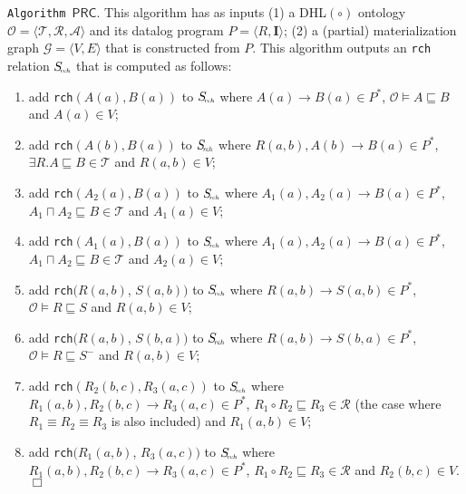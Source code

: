 \noindent\texttt{Algorithm~$\mathsf{PRC}$}. This algorithm has as inputs (1)
a DHL$(\circ)$ ontology $\mathcal{O}=\langle\mathcal{T},\mathcal{R},\mathcal{A}\rangle$
and its datalog program $P=\langle R, \textbf{I}\rangle$;
(2) a (partial) materialization graph $\mathcal{G}=\langle V,E\rangle$ that is constructed from $P$.
This algorithm outputs an \texttt{rch} relation $S_{\!\textit{\tiny rch}}$ that
is computed as follows:

\begin{enumerate}[leftmargin=4ex,label=$\bullet$]
\item add \texttt{rch}$(A(a),B(a))$ to $S_{\textit{\!\tiny rch}}$
  where $A(a)\rightarrow B(a)\in P^*$, $\mathcal{O}\models
  A\sqsubseteq B$ and $A(a)\in V$;

\item add \texttt{rch}$(A(b),B(a))$ to $S_{\textit{\!\tiny rch}}$ where $R(a,b),A(b)\rightarrow B(a)\in P^*$, $\exists R.A\sqsubseteq B\in\mathcal{T}$ and $R(a,b)\in V$;

\item add \texttt{rch}$(A_2(a),B(a))$ to $S_{\textit{\!\tiny rch}}$ where $A_1(a),A_2(a)\rightarrow B(a)\in P^*$,
    $A_1\sqcap A_2\sqsubseteq B\in\mathcal{T}$ and $A_1(a)\in V$;

\item add \texttt{rch}$(A_1(a),B(a))$ to $S_{\textit{\!\tiny rch}}$ where $A_1(a),A_2(a)\rightarrow B(a)\in P^*$,
    $A_1\sqcap A_2\sqsubseteq B\in\mathcal{T}$ and $A_2(a)\in V$;

\item add \texttt{rch}$(R(a,b)$, $S(a,b))$ to $S_{\textit{\!\tiny rch}}$ where $R(a,b)\rightarrow S(a,b)\in P^*$,
    $\mathcal{O}\models R\sqsubseteq S$ and $R(a,b)\in V$;

\item add \texttt{rch}$(R(a,b)$, $S(b,a))$ to $S_{\textit{\!\tiny rch}}$ where $R(a,b)\rightarrow S(b,a)\in P^*$,
    $\mathcal{O}\models R\sqsubseteq S^-$ and $R(a,b)\in V$;

\item add \texttt{rch}$(R_2(b,c),R_3(a,c))$ to $S_{\textit{\!\tiny rch}}$ where $R_1(a,b),R_2(b,c)\rightarrow R_3(a,c)\in P^*$,
    $R_1\circ R_2\sqsubseteq R_3\in\mathcal{R}$ (the case
    where $R_1\equiv R_2\equiv R_3$ is also included) and $R_1(a,b)\in V$;

\item add \texttt{rch}$(R_1(a,b)$, $R_3(a,c))$ to $S_{\textit{\!\tiny rch}}$ where $R_1(a,b),R_2(b,c)\rightarrow R_3(a,c)\in P^*$,
    $R_1\circ R_2\sqsubseteq R_3\in\mathcal{R}$ and $R_2(b,c)\in V$.\hfill$\Box$
\end{enumerate}

